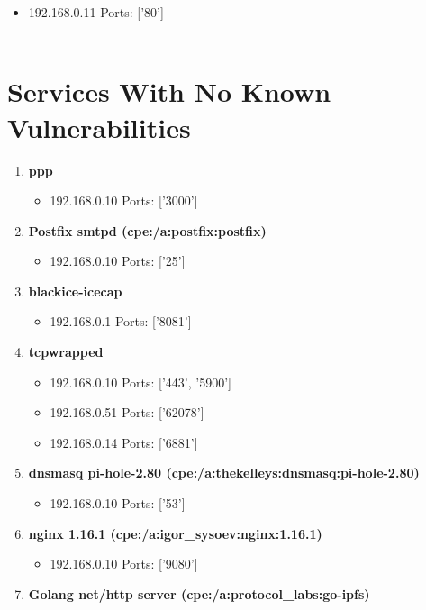 \documentclass{article}
\begin{document}
\begin{enumerate}[wide, labelwidth=!, labelindent=0pt,
                        label=\textbf{\large \arabic{enumi} \large}]
                         \begin{itemize}
\item 192.168.0.11 Ports: ['80']
\\ \\ 
 \end{itemize}
\end{enumerate}
\section*{Services With No Known Vulnerabilities}\begin{enumerate}[wide, labelwidth=!, labelindent=0pt,
        label=\textbf{\large \arabic{enumi} \large}]
\item \textbf{\large ppp  \large}
\begin{itemize}
\item 192.168.0.10 Ports: ['3000']
\end{itemize}
\item \textbf{\large Postfix smtpd (cpe:/a:postfix:postfix)  \large}
\begin{itemize}
\item 192.168.0.10 Ports: ['25']
\end{itemize}
\item \textbf{\large blackice-icecap  \large}
\begin{itemize}
\item 192.168.0.1 Ports: ['8081']
\end{itemize}
\item \textbf{\large tcpwrapped  \large}
\begin{itemize}
\item 192.168.0.10 Ports: ['443', '5900']
\item 192.168.0.51 Ports: ['62078']
\item 192.168.0.14 Ports: ['6881']
\end{itemize}
\item \textbf{\large dnsmasq pi-hole-2.80 (cpe:/a:thekelleys:dnsmasq:pi-hole-2.80)  \large}
\begin{itemize}
\item 192.168.0.10 Ports: ['53']
\end{itemize}
\item \textbf{\large nginx 1.16.1 (cpe:/a:igor\_sysoev:nginx:1.16.1)  \large}
\begin{itemize}
\item 192.168.0.10 Ports: ['9080']
\end{itemize}
\item \textbf{\large Golang net/http server (cpe:/a:protocol\_labs:go-ipfs)  \large}

\end{enumerate}
\end{document}
